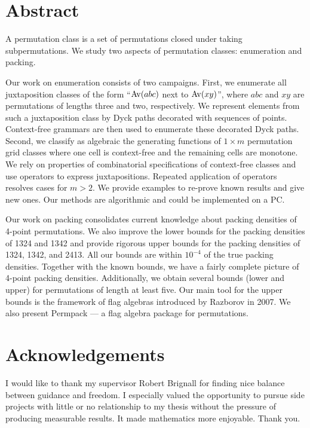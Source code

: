 \documentclass[12pt, a4paper, twoside]{report}
\begin{document}




\setcounter{secnumdepth}{-3}%
\chapter{Abstract}
A permutation class is a set of permutations closed under taking subpermutations. We study two aspects of permutation classes: enumeration and packing.

Our work on enumeration consists of two campaigns. First, we enumerate all juxtaposition classes of the form ``$\mathrm{Av}(abc)$ next to $\mathrm{Av}(xy)$'', where $abc$ and $xy$ are permutations of lengths three and two, respectively. We represent elements from such a juxtaposition class by Dyck paths decorated with sequences of points. Context-free grammars are then used to enumerate these decorated Dyck paths. Second, we classify as algebraic the generating functions of $1\times m$ permutation grid classes where one cell is context-free and the remaining cells are monotone. We rely on properties of combinatorial specifications of context-free classes and use operators to express juxtapositions. Repeated application of operators resolves cases for $m>2$. We provide examples to re-prove known results and give new ones. Our methods are algorithmic and could be implemented on a PC.

Our work on packing consolidates current knowledge about packing densities of 4-point permutations. We also improve the lower bounds for the packing densities of 1324 and 1342 and provide rigorous upper bounds for the packing densities of 1324, 1342, and 2413. All our bounds are within $10^{-4}$ of the true packing densities. Together with the known bounds, we have a fairly complete picture of 4-point packing densities. Additionally, we obtain several bounds (lower and upper) for permutations of length at least five. Our main tool for the upper bounds is the framework of flag algebras introduced by Razborov in 2007. We also present Permpack --- a flag algebra package for permutations. 
\afterpage{\null\newpage}

\chapter{Acknowledgements}
I would like to thank my supervisor Robert Brignall for finding nice balance between guidance and freedom. I especially valued the opportunity to pursue side projects with little or no relationship to my thesis without the pressure of producing measurable results. It made mathematics more enjoyable. Thank you.
\end{document}
